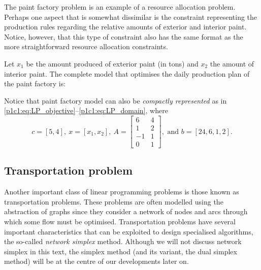 The paint factory problem is an example of a resource allocation problem. Perhaps one aspect that is somewhat dissimilar is the constraint representing the production rules regarding the relative amounts of exterior and interior paint. Notice, however, that this type of constraint also has the same format as the more straightforward resource allocation constraints.  

Let $x_1$ be the amount produced of exterior paint (in tons) and $x_2$ the amount of interior paint. The complete model that optimises the daily production plan of the paint factory is:
%
%
Notice that paint factory model can also be \emph{compactly represented} as in \eqref{p1c1:eq:LP_objective}--\eqref{p1c1:eq:LP_domain}, where
%
\begin{equation*}
	c = [5, 4], \ x = [x_1, x_2], \ A = \begin{bmatrix} 6 & 4 \\ 1 & 2 \\ -1 & 1 \\0 & 1 \end{bmatrix}, \text{ and } b = [24, 6, 1, 2].	
\end{equation*}
%


\subsection{Transportation problem}

Another important class of linear programming problems is those known as transportation problems. These problems are often modelled using the abstraction of graphs since they consider a network of nodes and arcs through which some flow must be optimised. Transportation problems have several important characteristics that can be exploited to design specialised algorithms, the so-called \emph{network simplex} method. Although we will not discuss network simplex in this text, the simplex method (and its variant, the dual simplex method) will be at the centre of our developments later on. %

